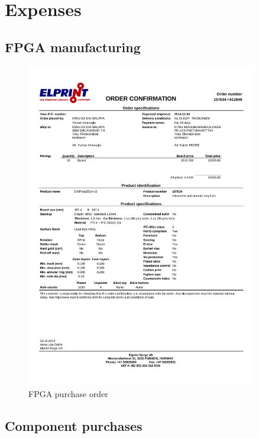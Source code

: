 \documentclass[../main/report.tex]{subfiles}
\begin{document}
\chapter{Expenses}

\section{FPGA manufacturing}

\begin{figure}[H]
	\centering
	\includegraphics[width=0.9\textwidth]{../appendix/assets/FPGA-purchase.pdf}
	\caption{FPGA purchase order}
	\label{fig: FPGA_order}
\end{figure}

\section{Component purchases}
\end{document}
